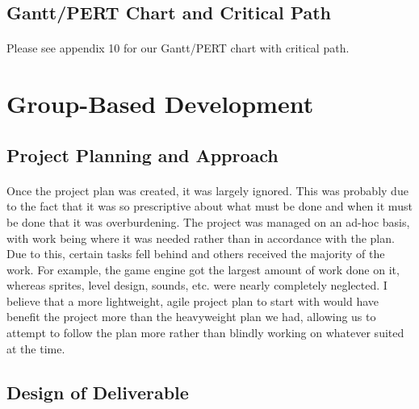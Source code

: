 \documentclass{article}
\begin{document}
\subsection{Gantt/PERT Chart and Critical Path}
\paragraph{}
Please see appendix 10 for our Gantt/PERT chart with critical path.
\section {Group-Based Development}
\subsection {Project Planning and Approach}
\paragraph{}
Once the project plan was created, it was largely ignored. This was probably due to the fact that it was so prescriptive about what must be done and when it must be done that it was overburdening. The project was managed on an ad-hoc basis, with work being where it was needed rather than in accordance with the plan. Due to this, certain tasks fell behind and others received the majority of the work. For example, the game engine got the largest amount of work done on it, whereas sprites, level design, sounds, etc. were nearly completely neglected. I believe that a more lightweight, agile project plan to start with would have benefit the project more than the heavyweight plan we had, allowing us to attempt to follow the plan more rather than blindly working on whatever suited at the time.
\subsection {Design of Deliverable}
\end{document}
